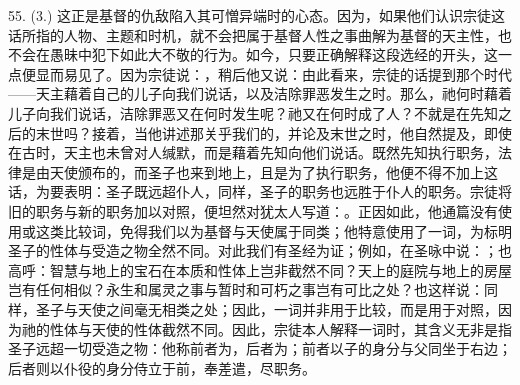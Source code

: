 55. (3.) 这正是基督的仇敌陷入其可憎异端时的心态。因为，如果他们认识宗徒这话所指的人物、主题和时机，就不会把属于基督人性之事曲解为基督的天主性，也不会在愚昧中犯下如此大不敬的行为。如今，只要正确解释这段选经的开头，这一点便显而易见了。因为宗徒说：，稍后他又说：由此看来，宗徒的话提到那个时代——天主藉着自己的儿子向我们说话，以及洁除罪恶发生之时。那么，祂何时藉着儿子向我们说话，洁除罪恶又在何时发生呢？祂又在何时成了人？不就是在先知之后的末世吗？接着，当他讲述那关乎我们的，并论及末世之时，他自然提及，即使在古时，天主也未曾对人缄默，而是藉着先知向他们说话。既然先知执行职务，法律是由天使颁布的，而圣子也来到地上，且是为了执行职务，他便不得不加上这话，为要表明：圣子既远超仆人，同样，圣子的职务也远胜于仆人的职务。宗徒将旧的职务与新的职务加以对照，便坦然对犹太人写道：。正因如此，他通篇没有使用或这类比较词，免得我们以为基督与天使属于同类；他特意使用了一词，为标明圣子的性体与受造之物全然不同。对此我们有圣经为证；例如，在圣咏中说：；也高呼：智慧与地上的宝石在本质和性体上岂非截然不同？天上的庭院与地上的房屋岂有任何相似？永生和属灵之事与暂时和可朽之事岂有可比之处？也这样说：同样，圣子与天使之间毫无相类之处；因此，一词并非用于比较，而是用于对照，因为祂的性体与天使的性体截然不同。因此，宗徒本人解释一词时，其含义无非是指圣子远超一切受造之物：他称前者为，后者为；前者以子的身分与父同坐于右边；后者则以仆役的身分侍立于前，奉差遣，尽职务。\par


